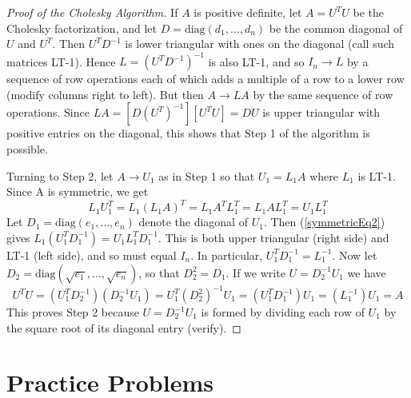 \documentclass{ximera}
\begin{document}
\begin{proof}[Proof of the Cholesky Algorithm]
If $A$ is positive definite, let $A = U^{T}U$ be the Cholesky factorization, and let $D = \mbox{diag}(d_{1}, \dots, d_{n})$ be the common diagonal of $U$ and $U^{T}$. Then $U^{T}D^{-1}$ is lower triangular with ones on the diagonal (call such matrices LT-1). Hence $L = (U^{T}D^{-1})^{-1}$ is also LT-1, and so $I_{n} \to L$ by a sequence of row operations each of which adds a multiple of a row
to a lower row (modify columns right to left). But then $A \to LA$ by the same sequence of row operations. Since $LA = [D(U^{T})^{-1}][U^{T}U] = DU$ is upper triangular with positive entries on the diagonal, this shows that Step 1 of the algorithm is possible.

Turning to Step 2, let $A \to U_{1}$ as in Step 1 so that $U_{1} = L_{1}A$ where $L_{1}$ is
LT-1. Since A is symmetric, we get
\begin{equation} \label{symmetricEq2}
L_{1}U_{1}^T = L_{1}(L_{1}A)^T = L_{1}A^TL_{1}^T = L_{1}AL_{1}^T = U_{1}L_{1}^T
\end{equation}
Let $D_{1} = \mbox{diag}(e_{1}, \dots, e_{n})$ denote the diagonal of $U_{1}$. Then (\ref{symmetricEq2}) gives $L_{1}(U_{1}^TD_{1}^{-1}) = U_{1}L_{1}^TD_{1}^{-1}$. This is both upper triangular (right side) and LT-1 (left side), and so must equal $I_{n}$. In particular, $U_{1}^TD_{1}^{-1} = L_{1}^{-1}$. Now let $D_{2} = \mbox{diag}(\sqrt{e_{1}}, \dots, \sqrt{e_{n}})$, so that $D_{2}^2 = D_{1}$. If we write $U = D_{2}^{-1}U_{1}$
 we have
\begin{equation*}
U^TU = (U_{1}^TD_{2}^{-1})(D_{2}^{-1}U_{1}) = U_{1}^T(D_{2}^2)^{-1}U_{1} = (U_{1}^TD_{1}^{-1})U_{1} = (L_{1}^{-1})U_{1} = A
\end{equation*}
This proves Step 2 because $U = D_{2}^{-1}U_{1}$ is formed by dividing each row of $U_{1}$ by the square root of its diagonal entry (verify).
\end{proof}

\section*{Practice Problems}
\end{document}

